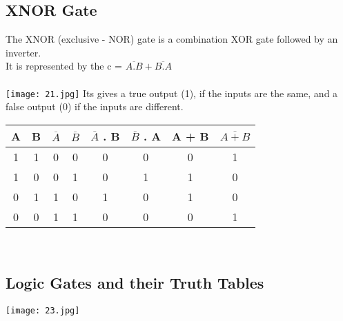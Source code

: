\documentclass[10pt,a4paper,onecolumn]{article}
\begin{document}
\subsection{XNOR Gate}
The XNOR (exclusive - NOR) gate is a combination XOR gate followed by an inverter. \\
 It is represented by the \color{red} c = $\overline{A.B} + \overline{B.A}$  \\ \color{black} \\
\texttt{[image: 21.jpg]}
Its gives a  true output (1), if the inputs are the same, and a false output (0) if the inputs are different. \\
\begin{table}[h!]
	\begin{center}
		\begin{tabular}{c|c|c|c|c|c|c|c}
			\textbf{A} & \textbf{B} & \textbf{$\overline{A}$} & \textbf{$\overline{B}$} & \textbf{$\overline{A}$ . B} & \textbf{$\overline{B}$ . A} & \textbf{A} + \textbf{B} & \textbf{$\overline{A + B}$}\\
			\hline
			1 & 1 & 0 & 0 & 0 & 0 & 0 & 1\\
			\hline
			1 & 0 & 0 & 1 & 0 & 1 & 1 & 0\\
			\hline
			0 & 1 & 1 & 0 & 1 & 0 & 1 & 0\\
			\hline
			0 & 0 & 1 & 1 & 0 & 0 & 0 & 1\\
			\hline
		\end{tabular}
	\end{center}
\end{table} \\

\subsection{Logic Gates and their Truth Tables}
\texttt{[image: 23.jpg]}
\end{document}
